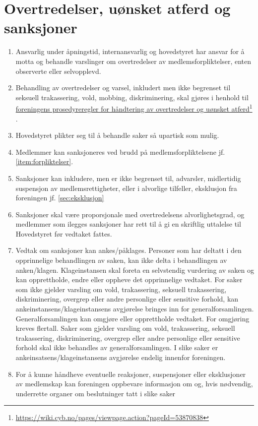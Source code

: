 \documentclass[8pt,norsk,a4paper]{article}
\newcommand\fhref[2]{%
	\href{#1}{#2}\footnote{\url{#1}}%
}
\begin{document}
\section{Overtredelser, uønsket atferd og sanksjoner}
\begin{enumerate}
    \item Ansvarlig under åpningstid, internansvarlig og hovedstyret har ansvar for å motta og behandle varslinger om overtredelser av medlemsforpliktelser, enten observerte eller selvopplevd.
    \item Behandling av overtredelser og varsel, inkludert men ikke begrenset til seksuell trakassering, vold, mobbing, diskriminering, skal gjøres i henhold til \fhref{https://wiki.cyb.no/pages/viewpage.action?pageId=53870838}{foreningens prosedyreregler for håndtering av overtredelser og uønsket atferd}\footnotemark.

    \item Hovedstyret plikter seg til å behandle saker så upartisk som mulig.
    \item Medlemmer kan sanksjoneres ved brudd på medlemsforpliktelsene jf. \ref{item:forpliktelser}. 
    \item Sanksjoner kan inkludere, men er ikke begrenset til, advarsler, midlertidig suspensjon av medlemsrettigheter, eller i alvorlige tilfeller, eksklusjon fra foreningen jf. \ref{sec:eksklusjon}
    \item Sanksjoner skal være proporsjonale med overtredelsens alvorlighetsgrad, og medlemmer som ilegges sanksjoner har rett til å gi en skriftlig uttalelse til Hovedstyret før vedtaket fattes.
    \item Vedtak om sanksjoner kan ankes/påklages. Personer som har deltatt i den opprinnelige behandlingen av saken, kan ikke delta i behandlingen av anken/klagen.
Klageinstansen skal foreta en selvstendig vurdering av saken og kan opprettholde, endre eller oppheve det opprinnelige vedtaket.
For saker som ikke gjelder varsling om vold, trakassering, seksuell trakassering, diskriminering, overgrep eller andre personlige eller sensitive forhold, kan ankeinstansens/klageinstansens avgjørelse bringes inn for generalforsamlingen. Generalforsamlingen kan omgjøre eller opprettholde vedtaket. For omgjøring kreves  flertall.
Saker som gjelder varsling om vold, trakassering, seksuell trakassering, diskriminering, overgrep eller andre personlige eller sensitive forhold skal ikke behandles av generalforsamlingen. I slike saker er ankeinsatsens/klageinstansens avgjørelse endelig innenfor foreningen.

	\item For å kunne håndheve eventuelle reaksjoner, suspensjoner eller eksklusjoner av medlemskap kan foreningen oppbevare informasjon om og, hvis nødvendig, underrette organer om beslutninger tatt i slike saker
\end{enumerate}
\end{document}
